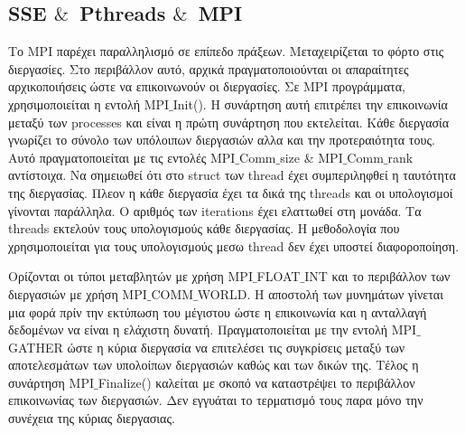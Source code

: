 \documentclass[11pt]{article}
\begin{document}
\vspace{20mm}
\subsection{SSE $\&$\  Pthreads $\&$\ MPI }
\hspace*{8mm}Το  MPI  παρέχει παραλληλισμό σε επίπεδο πράξεων. Μεταχειρίζεται το φόρτο στις διεργασίες. Στο περιβάλλον αυτό, αρχικά πραγματοποιούνται οι απαραίτητες αρχικοποιήσεις ώστε να επικοινωνούν οι διεργασίες. Σε  MPI προγράμματα, χρησιμοποιείται η εντολή  MPI$\_$Init(). Η συνάρτηση αυτή επιτρέπει την επικοινωνία μεταξύ των processes και είναι η πρώτη συνάρτηση που εκτελείται. Κάθε διεργασία γνωρίζει το σύνολο των υπόλοιπων διεργασιών αλλα και την προτεραιότητα τους. Αυτό πραγματοποιείται με τις εντολές  MPI$\_$Comm$\_$size \& MPI$\_$Comm$\_$rank αντίστοιχα. Να σημειωθεί ότι στο  struct  των  thread έχει συμπεριληφθεί η ταυτότητα της διεργασίας. Πλεον η κάθε διεργασία έχει τα δικά της  threads  και οι υπολογισμοί γίνονται παράλληλα. Ο αριθμός των iterations  έχει ελαττωθεί στη μονάδα. Τα  threads  εκτελούν τους υπολογισμούς κάθε διεργασίας. Η μεθοδολογία που χρησιμοποιείται για  τους υπολογισμούς μεσω  thread  δεν έχει υποστεί διαφοροποίηση. 

Ορίζονται οι τύποι μεταβλητών με χρήση MPI$\_$FLOAT$\_$INT και το περιβάλλον των διεργασιών με χρήση MPI$\_$COMM$\_$WORLD. Η αποστολή των μυνημάτων γίνεται μια φορά πρίν την εκτύπωση του μέγιστου ώστε η επικοινωνία και η ανταλλαγή δεδομένων να είναι η ελάχιστη δυνατή. Πραγματοποιείται με την εντολή MPI$\_$GATHER ώστε η κύρια διεργασία να επιτελέσει τις συγκρίσεις μεταξύ των αποτελεσμάτων των υπολοίπων διεργασιών καθώς και των δικών της. Τέλος η συνάρτηση MPI$\_$Finalize() καλείται με σκοπό να καταστρέψει το περιβάλλον επικοινωνίας των διεργασιών. Δεν εγγυάται το τερματισμό τους παρα μόνο την συνέχεια της κύριας διεργασιας. 
\end{document}
